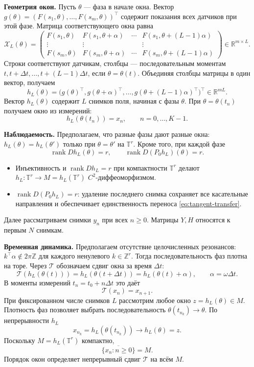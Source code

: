 \documentclass[11pt,a4paper]{article}
\begin{document}
\textbf{Геометрия окон.} Пусть $\theta$ --- фаза в начале окна.
Вектор $g(\theta)=(F(s_1,\theta),\ldots,F(s_m,\theta))^\top$
содержит показания всех датчиков при этой фазе.
Матрица соответствующего окна равна
$$
\mathcal X_L(\theta)=
\begin{pmatrix}
F(s_1,\theta)&F(s_1,\theta+\alpha)&\cdots&F(s_1,\theta+(L-1)\alpha)\\
\vdots&\vdots&&\vdots\\
F(s_m,\theta)&F(s_m,\theta+\alpha)&\cdots&F(s_m,\theta+(L-1)\alpha)
\end{pmatrix}
\in\mathbb R^{m\times L}.
$$
Строки соответствуют датчикам, столбцы --- последовательным моментам
$t,t+\Delta t,\ldots,t+(L-1)\Delta t$, если $\theta=\theta(t)$.
Объединяя столбцы матрицы в один вектор, получаем
\begin{equation}
h_L(\theta)=
\bigl(g(\theta)^\top,g(\theta+\alpha)^\top,\ldots,
g(\theta+(L-1)\alpha)^\top\bigr)^\top
\in\mathbb R^{mL}.
\label{eq:window-map}
\end{equation}
Вектор $h_L(\theta)$ содержит $L$ снимков поля, начиная с фазы $\theta$.
При $\theta=\theta(t_n)$ получаем окно из измерений:
$$
h_L(\theta(t_n))=x_n,\qquad n=0,\ldots,K-1.
$$

\textbf{Наблюдаемость.} Предполагаем, что разные фазы дают разные окна:
$h_L(\theta)=h_L(\theta')$ только при $\theta=\theta'$ на $\mathbb T^r$.
Кроме того, при каждой фазе
\begin{equation}
\operatorname{rank}Dh_L(\theta)=r,\qquad
\operatorname{rank}D(P_0h_L)(\theta)=r.
\label{eq:observability}
\end{equation}
\begin{itemize}
\setlength{\itemsep}{2pt}
\item Инъективность и $\operatorname{rank}Dh_L=r$ при компактности $\mathbb T^r$
делают $h_L:\mathbb T^r\to M=h_L(\mathbb T^r)$ $C^2$-диффеоморфизмом.
\item $\operatorname{rank}D(P_0h_L)=r$: удаление последнего снимка
сохраняет все касательные направления и обеспечивает единственность
переноса \eqref{eq:tangent-transfer}.
\end{itemize}

Далее рассматриваем снимки $y_n$ при всех $n\ge0$.
Матрицы $Y,H$ относятся к первым $N$ снимкам.

\textbf{Временная динамика.} Предполагаем отсутствие целочисленных резонансов:
$k^\top\alpha\notin2\pi\mathbb Z$ для каждого ненулевого $k\in\mathbb Z^r$.
Тогда последовательность фаз плотна на торе.
Через $\mathcal T$ обозначаем сдвиг окна за время $\Delta t$:
$$
\mathcal T(h_L(\theta(t)))=h_L(\theta(t+\Delta t))
=h_L(\theta(t)+\alpha),\qquad \alpha=\omega\Delta t.
$$
В моменты измерений $t_n=t_0+n\Delta t$ это даёт
$$
\mathcal T(x_n)=x_{n+1}.
$$
При фиксированном числе снимков $L$ рассмотрим любое окно $z=h_L(\theta)\in M$.
Плотность фаз позволяет выбрать последовательность
$\theta(t_{n_k})\to\theta$. По непрерывности $h_L$
$$
x_{n_k}=h_L(\theta(t_{n_k}))\longrightarrow h_L(\theta)=z.
$$
Поскольку $M=h_L(\mathbb T^r)$ компактно,
$$
\overline{\{x_n:n\ge0\}}=M.
$$
Порядок окон определяет непрерывный сдвиг $\mathcal T$ на всём $M$.
\end{document}
